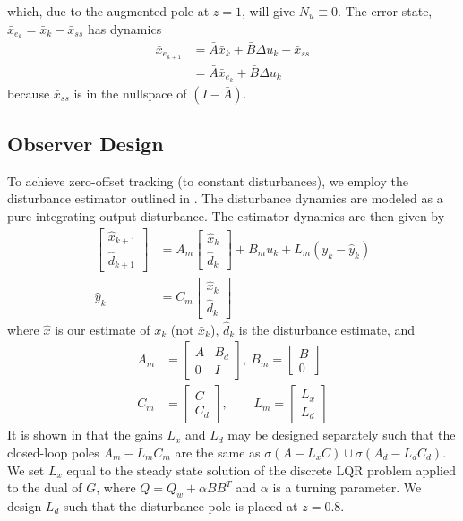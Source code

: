 \documentclass[journal,twocolumn,twoside]{IEEEtran}
\newcommand{\Ad}{\ensuremath{\bar A }\xspace}
\newcommand{\Bd}{\ensuremath{\bar B }\xspace}
\newcommand{\xd}{\ensuremath{\bar x }\xspace}
\newcommand{\x}{\ensuremath{x }\xspace}
\newcommand{\xdss}{\ensuremath{\bar x_{ss} }\xspace}
\newcommand{\dd}{\ensuremath{\Delta }\xspace}
\begin{document}
which, due to the augmented pole at $z=1$, will give \(N_u\equiv 0\). 
The error state, \({\xd_{e_k}=\xd_k - \xdss}\) has dynamics
\begin{align}
  \xd_{e_{k+1}} & = \Ad\xd_k + \Bd\dd u_k - \xdss \nonumber\\
            & = \Ad \xd_{e_k}   + \Bd \dd u_k\nonumber
\end{align}
              because $\xdss$ is in the nullspace of $(I - \Ad)$.
              
\subsection{Observer Design}\label{sec:dist_est}
To achieve zero-offset tracking (to constant disturbances), we employ the disturbance estimator outlined in \cite{maeder_offset-free_2007}. The disturbance dynamics are modeled as a pure integrating output disturbance. The estimator dynamics are then given by
\begin{align}
  \begin{bmatrix} \hat{\x}_{k+1}\\ \hat{d}_{k+1} \end{bmatrix}
  &= A_m
  \begin{bmatrix} \hat{\x}_{k}\\ \hat{d}_k\end{bmatrix}
    + B_m u_k + L_m(y_k - \hat y_k) \label{eqn:obsdyn}\\
  \hat y_k &= C_m\begin{bmatrix} \hat{\x}_k\label{eqn:yhat}\\
    \hat{d}_k \end{bmatrix}
\end{align}
where $\hat{x}$ is our estimate of $x_k$ (not $\bar{x}_k$), $\hat{d}_k$ is the disturbance estimate, and 
\begin{align}
  A_m& = \begin{bmatrix}
    A & B_d \\ 0 & I
  \end{bmatrix},\:
  B_m =
  \begin{bmatrix}
    B \\ 0
  \end{bmatrix} \\
  C_m &= 
    \begin{bmatrix}
    C \\ C_d
  \end{bmatrix},\:\:\:\:\:\:\:\:\;
  L_m = \begin{bmatrix} L_x\\L_d \end{bmatrix} \label{eqn:CmLm}
\end{align}
It is shown in \cite{maeder_offset-free_2007} that the gains $L_x$ and $L_d$ may be designed separately such that the closed-loop poles $A_m - L_mC_m$ are the same as $\sigma(A-L_xC)\cup \sigma(A_d-L_dC_d)$.
We set $L_x$ equal to the steady state solution of the discrete LQR problem applied to the dual of $G$, where $Q = Q_w + \alpha BB^T$ and $\alpha$ is a turning parameter. We design $L_d$ such that the disturbance pole is placed at $z=0.8$.
\end{document}
